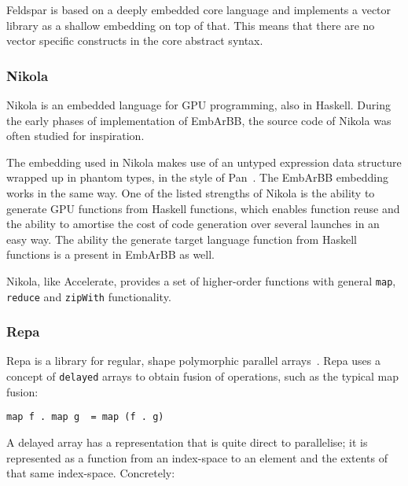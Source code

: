 Feldspar is based on a deeply embedded core language and implements 
a vector library as a shallow embedding on top of that. 
This means that there are no vector specific 
constructs in the core abstract syntax. 




\subsubsection{Nikola} 
Nikola is an embedded language for GPU programming\cite{NIKOLA}, also
in Haskell.  
During the early phases of implementation of EmbArBB, the source code of 
Nikola was often studied for inspiration.

The embedding used in Nikola makes use of an untyped expression 
data structure wrapped up in phantom types, in the style of Pan~\cite{ELLIJFP}.
The EmbArBB embedding works in the same way. 
One of the listed strengths of Nikola is the ability to generate GPU functions 
from Haskell functions, which enables function reuse and the ability to 
amortise the cost of code generation over several launches in an easy 
way. The ability the generate target language function from Haskell functions 
is a present in EmbArBB as well. 

Nikola, like Accelerate, provides a set of higher-order functions with
general {\tt map}, {\tt reduce} and {\tt zipWith} functionality.

\subsubsection{Repa} 
Repa is a library for regular, shape polymorphic parallel arrays~\cite{REPA}. Repa 
uses a concept of {\tt delayed} arrays to obtain fusion of operations, such as the 
typical map fusion:
\begin{verbatim}
map f . map g  = map (f . g)
\end{verbatim} 
A delayed array 
has a representation that is quite direct to parallelise; it is represented 
as a function from an index-space to an element and the extents of that same 
index-space. Concretely: 

